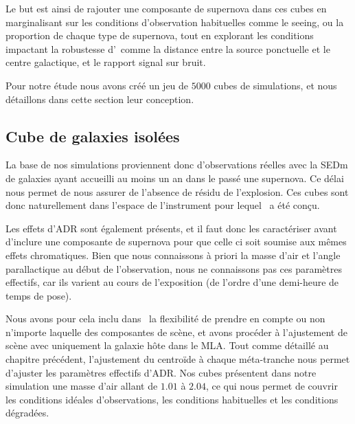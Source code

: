 \documentclass[../main/main.tex]{subfiles}
\begin{document}
Le but est ainsi de rajouter une composante de supernova dans ces
cubes en marginalisant sur les conditions d'observation habituelles
comme le seeing, ou la proportion de chaque type de supernova, tout en explorant
les conditions impactant la robustesse d'\hypergal\ comme la distance
entre la source ponctuelle et le centre galactique, et le rapport signal
sur bruit.

Pour notre étude nous avons créé un jeu de $5000$ cubes de simulations,
et nous  détaillons dans cette section leur conception.

\subsection{Cube de galaxies isolées}

La base de nos simulations proviennent donc d'observations réelles avec
la SEDm de galaxies ayant accueilli au moins un an dans le passé une
supernova. Ce délai nous permet de nous assurer de l'absence de résidu de l'explosion.
Ces cubes sont donc naturellement dans l'espace de l'instrument pour
lequel \hypergal\ a été conçu.

Les effets d'ADR sont également présents, et il faut donc les
caractériser avant d'inclure une composante de supernova pour que celle
ci soit soumise aux mêmes effets chromatiques. 
Bien que nous connaissons à priori la masse d'air et l'angle
parallactique au début de l'observation, nous ne connaissons pas ces
paramètres effectifs, car ils varient au cours de l'exposition
(de l'ordre d'une demi-heure de temps de pose).

Nous avons pour cela inclu dans \hypergal\ la flexibilité de prendre en
compte ou non n'importe laquelle des composantes de scène, et avons
procéder à l'ajustement de scène avec uniquement la galaxie hôte dans le
MLA. Tout comme détaillé au chapitre précédent, l'ajustement du
centroïde à chaque méta-tranche nous permet d'ajuster les paramètres
effectifs d'ADR. Nos cubes présentent dans notre simulation une masse
d'air allant de $1.01$ à $2.04$, ce qui nous permet de couvrir les
conditions idéales d'observations, les conditions habituelles et les
conditions dégradées.
\end{document}
